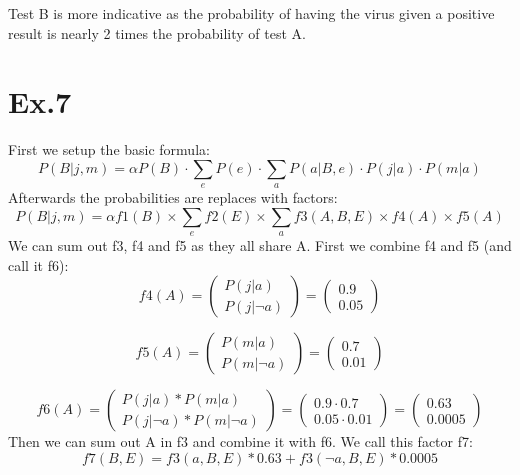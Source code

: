 \documentclass[11pt]{article}
\begin{document}
\noindent
Test B is more indicative as the probability of having the virus given a positive result is nearly 2 times the probability of test A.

\section*{Ex.7}

First we setup the basic formula:
$$P(B|j,m) = \alpha P(B) \cdot \sum_{e}P(e) \cdot \sum_{a}P(a|B,e) \cdot P(j|a) \cdot P(m|a)$$
Afterwards the probabilities are replaces with factors:
$$P(B|j,m) = \alpha f1(B) \times \sum_{e}f2(E) \times \sum_{a}f3(A,B,E) \times f4(A) \times f5(A)$$
We can sum out f3, f4 and f5 as they all share A. First we combine f4 and f5 (and call it f6):
$$ f4(A) = 
\begin{pmatrix}
  P(j|a) \\
  P(j|\neg a)
\end{pmatrix}
 = 
\begin{pmatrix}
  0.9 \\
  0.05
\end{pmatrix}
$$ 
 
$$ f5(A) = 
\begin{pmatrix}
  P(m|a) \\
  P(m|\neg a)
\end{pmatrix}
 = 
\begin{pmatrix}
  0.7 \\
  0.01
\end{pmatrix}
$$ 

$$ f6(A) = 
\begin{pmatrix}
  P(j|a)*P(m|a) \\
  P(j|\neg a)*P(m|\neg a)
\end{pmatrix}
 = 
\begin{pmatrix}
  0.9 \cdot 0.7 \\
  0.05 \cdot 0.01
\end{pmatrix}
 = 
\begin{pmatrix}
  0.63 \\
  0.0005
\end{pmatrix}
$$ 
Then we can sum out A in f3 and combine it with f6. We call this factor f7:
$$
  f7(B,E) = f3(a,B,E) * 0.63 + f3(\neg a,B,E) * 0.0005
$$
\end{document}
